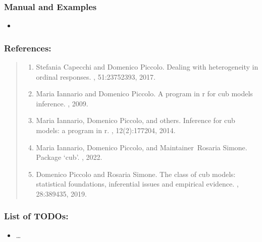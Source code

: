 \documentclass[letterpaper,10pt,english]{sphinxmanual}
\begin{document}
\subsubsection{Manual and Examples}
\label{\detokenize{cubmods:id592}}\begin{itemize}
\item {} 
\sphinxAtStartPar
{}

\end{itemize}


\subsubsection{References:}
\label{\detokenize{cubmods:id593}}\begin{quote}
\begin{enumerate}
%
\setcounter{enumi}{0}
\item {} 
\sphinxAtStartPar
Stefania Capecchi and Domenico Piccolo. Dealing with heterogeneity in ordinal responses. , 51:2375\textendash{}2393, 2017.

\item {} 
\sphinxAtStartPar
Maria Iannario and Domenico Piccolo. A program in r for cub models inference. , 2009.

\item {} 
\sphinxAtStartPar
Maria Iannario, Domenico Piccolo, and others. Inference for cub models: a program in r. , 12(2):177\textendash{}204, 2014.

\item {} 
\sphinxAtStartPar
Maria Iannario, Domenico Piccolo, and Maintainer Rosaria Simone. Package ‘cub’. , 2022.

\item {} 
\sphinxAtStartPar
Domenico Piccolo and Rosaria Simone. The class of cub models: statistical foundations, inferential issues and empirical evidence. , 28:389\textendash{}435, 2019.

\end{enumerate}
\end{quote}


\subsubsection{List of TODOs:}
\label{\detokenize{cubmods:id631}}\begin{itemize}
\item {} 
\sphinxAtStartPar
…

\end{itemize}
\end{document}
